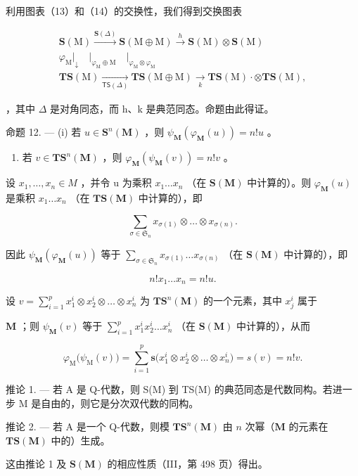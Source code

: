 利用图表（13）和（14）的交换性，我们得到交换图表

\[
\begin{array}{l} \mathbf {S} (\mathrm{M}) \xrightarrow {\mathbf {S} (\Delta)} \mathbf {S} (\mathrm{M} \oplus \mathrm{M}) \xrightarrow {h} \mathbf {S} (\mathrm{M}) \otimes \mathbf {S} (\mathrm{M}) \\ \varphi_ {\mathrm{M}} \Bigg | _ {\downarrow} \quad \Bigg | _ {\varphi_ {\mathrm{M}} \oplus \mathrm{M}} \quad \Bigg | _ {\varphi_ {\mathrm{M}} \otimes \varphi_ {\mathrm{M}}} \\ \mathbf {T S} (\mathrm{M}) \xrightarrow [ \mathsf {T S} (\Delta) ]{} \mathbf {T S} (\mathrm{M} \oplus \mathrm{M}) \xrightarrow [ k ]{} \mathbf {T S} (\mathrm{M}) \cdot \otimes \mathbf {T S} (\mathrm{M}), \end{array}
\]

，其中 \(\Delta\) 是对角同态，而 h、k 是典范同态。命题由此得证。

命题 12. --- (i) 若 \(u \in \mathbf{S}^n(\mathbf{M})\) ，则 \(\psi_{\mathbf{M}}(\varphi_{\mathbf{M}}(u)) = n!u\) 。

\begin{enumerate}
\def\labelenumi{(\roman{enumi})}
\setcounter{enumi}{1}
\tightlist
\item
  若 \(v \in \mathbf{T}\mathbf{S}^n(\mathbf{M})\) ，则 \(\varphi_{\mathbf{M}}(\psi_{\mathbf{M}}(v)) = n!v\) 。
\end{enumerate}

设 \(x_{1}, \ldots, x_{n} \in M\) ，并令 u 为乘积 \(x_{1} \ldots x_{n}\) （在 \(\mathbf{S}(\mathbf{M})\) 中计算的）。则 \(\varphi_{\mathbf{M}}(u)\) 是乘积 \(x_{1} \ldots x_{n}\) （在 \(\mathbf{T}\mathbf{S}(\mathbf{M})\) 中计算的），即

\[
\sum_ {\sigma \in \mathfrak {S} _ {n}} x _ {\sigma (1)} \otimes \dots \otimes x _ {\sigma (n)}.
\]

因此 \(\psi_{\mathbf{M}}(\varphi_{\mathbf{M}}(u))\) 等于 \(\sum_{\sigma \in \mathfrak{S}_n}x_{\sigma (1)}\ldots x_{\sigma (n)}\) （在 \(\mathbf{S}(\mathbf{M})\) 中计算的），即

\[
n! x _ {1} \dots x _ {n} = n! u.
\]

设 \(v = \sum_{i=1}^{p} x_1^i \otimes x_2^i \otimes \ldots \otimes x_n^i\) 为 \(\mathbf{TS}^n(\mathbf{M})\) 的一个元素，其中 \(x_j^i\) 属于

\(\mathbf{M}\) ；则 \(\psi_{\mathbf{M}}(v)\) 等于 \(\sum_{i=1}^{p} x_1^i x_2^i \ldots x_n^i\) （在 \(\mathbf{S}(\mathbf{M})\) 中计算的），从而

\[
\varphi_ {\mathrm{M}} \big (\psi_ {\mathrm{M}} (v) \big) = \sum_ {i = 1} ^ {p} \mathbf {s} \big (x _ {1} ^ {i} \otimes x _ {2} ^ {i} \otimes \dots \otimes x _ {n} ^ {i} \big) = s (v) = n! v.
\]

推论 1. --- 若 A 是 Q-代数，则 S(M) 到 TS(M) 的典范同态是代数同构。若进一步 M 是自由的，则它是分次双代数的同构。

推论 2. --- 若 A 是一个 Q-代数，则模 \(\mathbf{TS}^n (\mathbf{M})\) 由 \(n\) 次幂（\(\mathbf{M}\) 的元素在 \(\mathbf{TS}(\mathbf{M})\) 中的）生成。

这由推论 1 及 \(\mathbf{S}(\mathbf{M})\) 的相应性质（III，第 498 页）得出。

